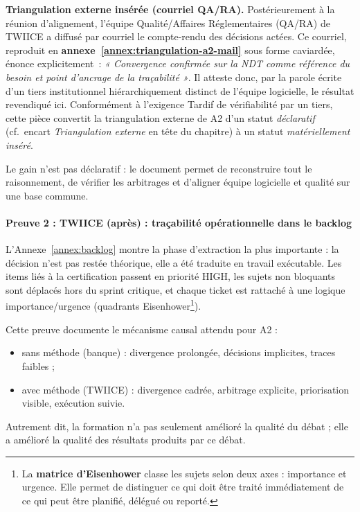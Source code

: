 \textbf{Triangulation externe insérée (courriel QA/RA).} Postérieurement à la réunion d'alignement, l'équipe Qualité/Affaires Réglementaires (QA/RA) de TWIICE a diffusé par courriel le compte-rendu des décisions actées. Ce courriel, reproduit en \textbf{annexe~\ref{annex:triangulation-a2-mail}} sous forme caviardée, énonce explicitement~: \emph{« Convergence confirmée sur la NDT comme référence du besoin et point d'ancrage de la traçabilité »}. Il atteste donc, par la parole écrite d'un tiers institutionnel hiérarchiquement distinct de l'équipe logicielle, le résultat revendiqué ici. Conformément à l'exigence Tardif de vérifiabilité par un tiers, cette pièce convertit la triangulation externe de A2 d'un statut \emph{déclaratif} (cf.~encart \emph{Triangulation externe} en tête du chapitre) à un statut \emph{matériellement inséré}.

Le gain n'est pas déclaratif : le document permet de reconstruire tout le raisonnement, de vérifier les arbitrages et d'aligner équipe logicielle et qualité sur une base commune.

\paragraph{Preuve 2 : TWIICE (après) : traçabilité opérationnelle dans le backlog}

L'Annexe~\ref{annex:backlog} montre la phase d'extraction la plus importante : la décision n'est pas restée théorique, elle a été traduite en travail exécutable. Les items liés à la certification passent en priorité HIGH, les sujets non bloquants sont déplacés hors du sprint critique, et chaque ticket est rattaché à une logique importance/urgence (quadrants Eisenhower\footnote{La \textbf{matrice d'Eisenhower} classe les sujets selon deux axes : importance et urgence. Elle permet de distinguer ce qui doit être traité immédiatement de ce qui peut être planifié, délégué ou reporté.\label{fn:eisenhower}}).

Cette preuve documente le mécanisme causal attendu pour A2 :

\begin{itemize}
  \item sans méthode (banque) : divergence prolongée, décisions implicites, traces faibles ;
  \item avec méthode (TWIICE) : divergence cadrée, arbitrage explicite, priorisation visible, exécution suivie.
\end{itemize}

Autrement dit, la formation n'a pas seulement amélioré la qualité du débat ; elle a amélioré la qualité des résultats produits par ce débat.

